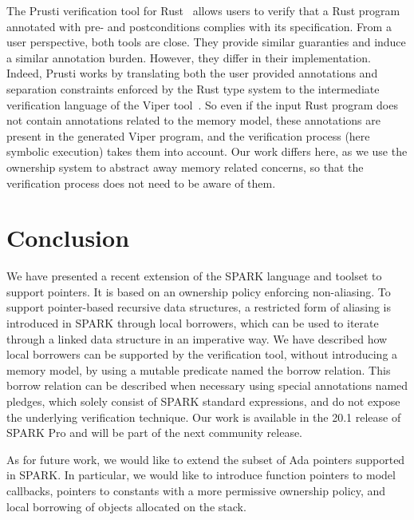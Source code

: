 \documentclass[runningheads]{llncs}
\begin{document}
The Prusti verification tool for Rust~\cite{astrauskas2019leveraging} allows users to verify that a Rust program annotated with pre- and postconditions complies with its specification. From a user perspective, both tools are close. They provide similar guaranties and induce a similar annotation burden. However, they differ in their implementation. Indeed, Prusti works by translating both the user provided annotations and separation constraints enforced by the Rust type system to the intermediate verification language of the Viper tool~\cite{muller2016viper}. %
So even if the input Rust program does not contain annotations related to the memory model, these annotations are present in the generated Viper program, and the verification process (here symbolic execution) takes them into account. Our work differs here, as we use the ownership system to abstract away memory related concerns, so that the verification process does not need to be aware of them.

\section{Conclusion}
We have presented a recent extension of the SPARK language and toolset to support pointers. It is based on an ownership policy enforcing non-aliasing. To support pointer-based recursive data structures, a restricted form of aliasing is introduced in SPARK through local borrowers, which can be used to iterate through a linked data structure in an imperative way. We have described how local borrowers can be supported by the verification tool, without introducing a memory model, by using a mutable predicate named the borrow relation. This borrow relation can be described when necessary using special annotations named pledges, which solely consist of SPARK standard expressions, and do not expose the underlying verification technique. Our work is available in the 20.1 release of SPARK Pro and will be part of the next community release.

As for future work, we would like to extend the subset of Ada pointers supported in SPARK. In particular, we would like to introduce function pointers to model callbacks, pointers to constants with a more permissive ownership policy, and local borrowing of objects allocated on the stack.
\end{document}
